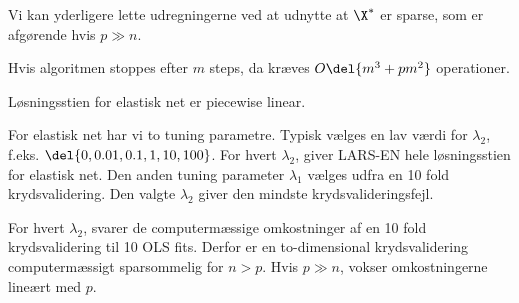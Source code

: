 Vi kan yderligere lette udregningerne ved at udnytte at \(\X^*\) er sparse, som er afgørende hvis \(p \gg n\).

Hvis algoritmen stoppes efter \(m\) steps, da kræves \(O \del{m^3 + pm^2}\) operationer.

Løsningsstien for elastisk net er piecewise linear.

For elastisk net har vi to tuning parametre. 
Typisk vælges en lav værdi for \(\lambda_2\), f.eks. \(\del{0,0.01,0.1,1,10,100}\).
For hvert \(\lambda_2\), giver LARS-EN hele løsningsstien for elastisk net.
Den anden tuning parameter \(\lambda_1\) vælges udfra en 10 fold krydsvalidering.
Den valgte \(\lambda_2\) giver den mindste krydsvalideringsfejl.

For hvert \(\lambda_2\), svarer de computermæssige omkostninger af en 10 fold krydsvalidering til 10 OLS fits.
Derfor er en to-dimensional krydsvalidering computermæssigt sparsommelig for \(n > p\).
Hvis \(p \gg n\), vokser omkostningerne lineært med \(p\).
%
